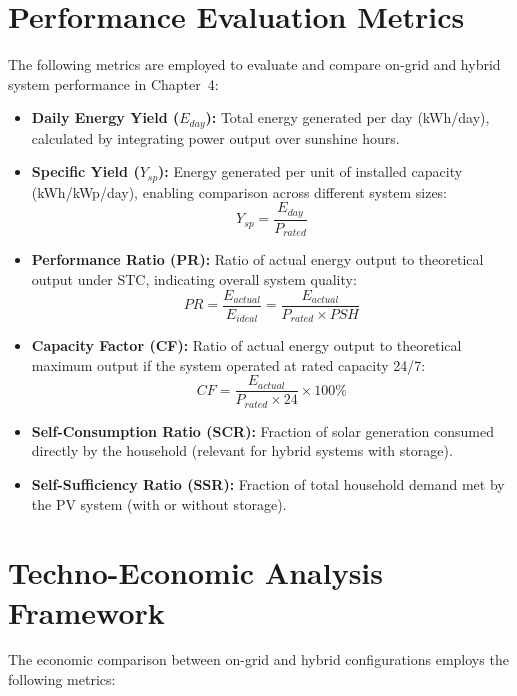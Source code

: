 \section{Performance Evaluation Metrics}

The following metrics are employed to evaluate and compare on-grid and hybrid system performance in Chapter~4:

\begin{itemize}
    \item \textbf{Daily Energy Yield ($E_{day}$):} Total energy generated per day (kWh/day), calculated by integrating power output over sunshine hours.
    \item \textbf{Specific Yield ($Y_{sp}$):} Energy generated per unit of installed capacity (kWh/kWp/day), enabling comparison across different system sizes:
    \begin{equation}
        Y_{sp} = \frac{E_{day}}{P_{rated}}
        \label{eq:specific_yield}
    \end{equation}
    \item \textbf{Performance Ratio (PR):} Ratio of actual energy output to theoretical output under STC, indicating overall system quality:
    \begin{equation}
        PR = \frac{E_{actual}}{E_{ideal}} = \frac{E_{actual}}{P_{rated} \times PSH}
        \label{eq:pr}
    \end{equation}
    \item \textbf{Capacity Factor (CF):} Ratio of actual energy output to theoretical maximum output if the system operated at rated capacity 24/7:
    \begin{equation}
        CF = \frac{E_{actual}}{P_{rated} \times 24} \times 100\%
        \label{eq:cf}
    \end{equation}
    \item \textbf{Self-Consumption Ratio (SCR):} Fraction of solar generation consumed directly by the household (relevant for hybrid systems with storage).
    \item \textbf{Self-Sufficiency Ratio (SSR):} Fraction of total household demand met by the PV system (with or without storage).
\end{itemize}


\section{Techno-Economic Analysis Framework}

The economic comparison between on-grid and hybrid configurations employs the following metrics:

